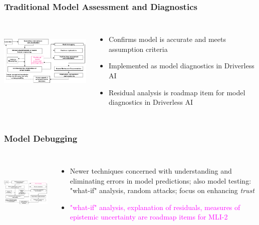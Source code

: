 \documentclass[11pt,
               aspectratio=169,
               hyperref={colorlinks}
               ]{beamer}
\begin{document}
		\begin{frame}
		
			\frametitle{Traditional Model Assessment and Diagnostics}		
			
			\begin{columns}			
			
				\centering
				\includegraphics[height=100pt]{img/ma.png}
				
				\vspace{-5pt}
				\begin{itemize}
					\item Confirms model is accurate and meets assumption criteria
					\item Implemented as model diagnostics in Driverless AI
					\item Residual analysis is roadmap item for model diagnostics in Driverless AI
				\end{itemize}
				
			\end{columns}
		
		\end{frame}

		\begin{frame}
		
			\frametitle{Model Debugging}		
			
			\begin{columns}
	
				\column{0.5\linewidth}
				\centering
				\includegraphics[height=100pt]{img/md.png}
				
				\column{0.5\linewidth}
				\vspace{-5pt}
				\begin{itemize}
					\item Newer techniques concerned with understanding and eliminating errors in model predictions; also model testing: "what-if" analysis, random attacks; focus on enhancing \textit{trust}
					\item \textcolor{magenta}{"what-if" analysis, explanation of residuals, measures of epistemic uncertainty are roadmap items for MLI-2}
				\end{itemize}
				
			\end{columns}			
		
		\end{frame}
\end{document}

